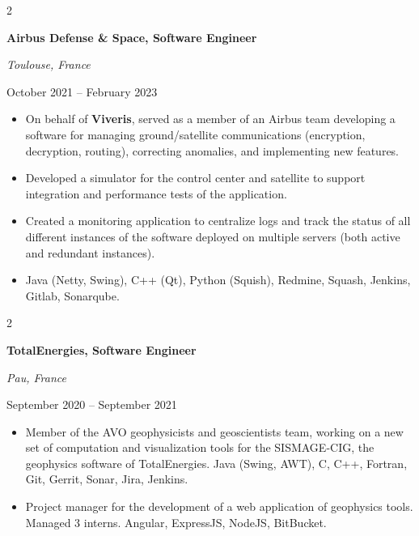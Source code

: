 \documentclass[10pt, letterpaper]{article}
\newenvironment{highlights}{
    \begin{itemize}[
        topsep=0.10 cm,
        parsep=0.10 cm,
        partopsep=0pt,
        itemsep=0pt,
        leftmargin=0.4 cm + 10pt
    ]
}{
    \end{itemize}
} %
\newenvironment{twocolentry}[2][]{
    \onecolentry
    \def\secondColumn{#2}
    \setcolumnwidth{\fill, 6 cm}
    \begin{paracol}{2}
}{
    \switchcolumn \raggedleft \secondColumn
    \end{paracol}
    \endonecolentry
} %
\begin{document}
        \vspace{0.2 cm}

        \begin{twocolentry}{\color{secondaryColor}October 2021 – February 2023}
            \textbf{Airbus Defense \& Space, Software Engineer}

            \textit{Toulouse, France}
        \end{twocolentry}
            \begin{highlights}
                \item On behalf of \textbf{Viveris}, served as a member of an Airbus team developing a software for managing ground/satellite communications (encryption, decryption, routing), correcting anomalies, and implementing new features.
                \item Developed a simulator for the control center and satellite to support integration and performance tests of the application.
                \item Created a monitoring application to centralize logs and track the status of all different instances of the software deployed on multiple servers (both active and redundant instances).
                \item  Java (Netty, Swing), C++ (Qt), Python (Squish), Redmine, Squash, Jenkins, Gitlab, Sonarqube.
            \end{highlights}
        

        \vspace{0.2 cm}

        \begin{twocolentry}{\color{secondaryColor}September 2020 – September 2021}
            \textbf{TotalEnergies, Software Engineer}

            \textit{Pau, France}
        \end{twocolentry}

        \begin{highlights}
            \item Member of the AVO geophysicists and geoscientists team, working on a new set of computation and visualization tools for the SISMAGE-CIG, the geophysics software of TotalEnergies.
            \subitem Java (Swing, AWT), C, C++, Fortran, Git, Gerrit, Sonar, Jira, Jenkins.
            \item Project manager for the development of a web application of geophysics tools. Managed 3 interns.
            \subitem Angular, ExpressJS, NodeJS, BitBucket.
        \end{highlights}
        
\end{document}
